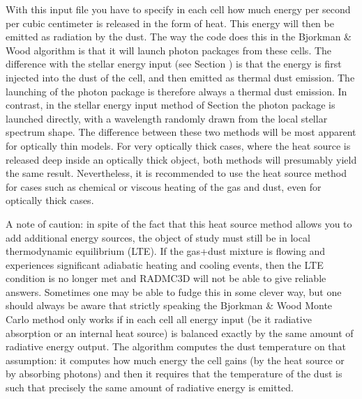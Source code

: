 \documentclass[letterpaper,10pt,english]{sphinxmanual}
\begin{document}
With this input file you have to specify in each cell how much energy per
second per cubic centimeter is released in the form of heat. This energy
will then be emitted as radiation by the dust. The way the code does this in
the Bjorkman \& Wood algorithm is that it will launch photon packages from
these cells. The difference with the stellar energy input (see Section
{\hyperref[\detokenize{stars:sec-distrib-of-stars}]{}}) is that the energy is first injected into the
dust of the cell, and then emitted as thermal dust emission. The launching
of the photon package is therefore always a thermal dust emission. In
contrast, in the stellar energy input method of Section
{\hyperref[\detokenize{stars:sec-distrib-of-stars}]{}} the photon package is launched directly, with a
wavelength randomly drawn from the local stellar spectrum shape. The
difference between these two methods will be most apparent for optically
thin models. For very optically thick cases, where the heat source is
released deep inside an optically thick object, both methods will
presumably yield the same result. Nevertheless, it is recommended to
use the heat source method for cases such as chemical or viscous heating
of the gas and dust, even for optically thick cases.

A note of caution: in spite of the fact that this heat source method allows
you to add additional energy sources, the object of study must still be in
local thermodynamic equilibrium (LTE). If the gas+dust mixture is flowing
and experiences significant adiabatic heating and cooling events, then the
LTE condition is no longer met and RADMC\sphinxhyphen{}3D will not be able to give
reliable answers. Sometimes one may be able to fudge this in some clever
way, but one should always be aware that strictly speaking the Bjorkman \&
Wood Monte Carlo method only works if in each cell all energy input (be it
radiative absorption or an internal heat source) is balanced exactly by the
same amount of radiative energy output. The algorithm  computes
the dust temperature on that assumption: it computes how much energy the
cell gains (by the heat source or by absorbing photons) and then it requires
that the temperature of the dust is such that precisely the same amount of
radiative energy is emitted.
\end{document}
